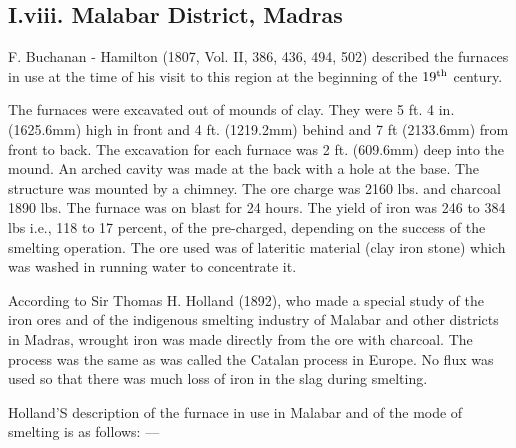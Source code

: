 \vspace{-.3cm}

\subsection*{I.viii.  Malabar District, Madras}\label{subsection-8}

\vspace{-.2cm}

F. Buchanan - Hamilton (1807, Vol. II, 386, 436, 494, 502) described the furnaces in use at the time of his visit to this region at the beginning of the $19^{\rm th}$ century.

The furnaces were excavated out of mounds of clay. They were 5 ft. 4 in. (1625.6mm) high in front and 4 ft. (1219.2mm) behind and 7 ft (2133.6mm) from front to back. The excavation for each furnace was 2 ft. (609.6mm) deep into the mound. An arched cavity was made at the back with a hole at the base. The structure was mounted by a chimney. The ore charge was 2160 lbs. and charcoal 1890 lbs. The furnace was on blast for 24 hours. The yield of iron was 246 to 384 lbs i.e., 118 to 17 percent, of the pre-charged, depending on the success of the smelting operation. The ore used was of lateritic material (clay iron stone) which was washed in running water to concentrate it. 

According to Sir Thomas H. Holland (1892), who made a special study of the iron ores and of the indigenous smelting industry of Malabar and other districts in Madras, wrought iron was made directly from the ore with charcoal. The process was the same as was called the Catalan process in Europe. No flux was used so that there was much loss of iron in the slag during smelting. 

Holland’S description of the furnace in use in Malabar and of the mode of smelting is as follows: — 

